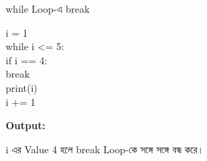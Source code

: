 \begin{codeoutputbox}{\textenglish{\ttfamily while} Loop-এ \textenglish{\ttfamily break}}

\noindent
\begin{minipage}[t]{0.54\linewidth}
\codeheading

\begin{english}
\ttfamily
i = 1\\
while i <= 5:\\
\hspace*{4mm}if i == 4:\\
\hspace*{8mm}break\\
\hspace*{4mm}print(i)\\
\hspace*{4mm}i += 1
\end{english}

\end{minipage}
\hfill
\begin{minipage}[t]{0.42\linewidth}
\outputheading

\textbf{Output:}

\begin{center}
\textenglish{  }
\end{center}

\textenglish{\ttfamily i}
এর Value 4 হলে
\textenglish{\ttfamily break}
Loop-কে সঙ্গে সঙ্গে বন্ধ করে।

\end{minipage}

\end{codeoutputbox}



